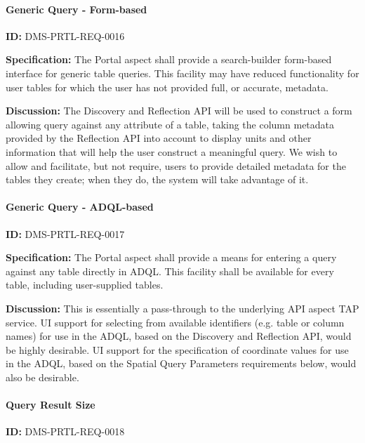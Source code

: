 \documentclass[SE,toc,lsstdraft]{lsstdoc}
\begin{document}
\paragraph{Generic Query - Form-based}\hfill  %

\label{DMS-PRTL-REQ-0016}
\textbf{ID:} DMS-PRTL-REQ-0016

\textbf{Specification:}
The Portal aspect shall provide a search-builder form-based interface for generic table queries.  This facility may have reduced functionality for user tables for which the user has not provided full, or accurate, metadata.

\textbf{Discussion:}
The Discovery and Reflection API will be used to construct a form allowing query against any attribute of a table, taking the column metadata provided by the Reflection API into account to display units and other information that will help the user construct a meaningful query.
We wish to allow and facilitate, but not require, users to provide detailed metadata for the tables they create; when they do, the system will take advantage of it.

\paragraph{Generic Query - ADQL-based}\hfill  %

\label{DMS-PRTL-REQ-0017}
\textbf{ID:} DMS-PRTL-REQ-0017

\textbf{Specification:}
The Portal aspect shall provide a means for entering a query against any table directly in ADQL.  This facility shall be available for every table, including user-supplied tables.

\textbf{Discussion:}
This is essentially a pass-through to the underlying API aspect TAP service.
UI support for selecting from available identifiers (e.g. table or column names) for use in the ADQL, based on the Discovery and Reflection API, would be highly desirable.
UI support for the specification of coordinate values for use in the ADQL, based on the Spatial Query Parameters requirements below, would also be desirable.

\paragraph{Query Result Size}\hfill  %

\label{DMS-PRTL-REQ-0018}
\textbf{ID:} DMS-PRTL-REQ-0018
\end{document}
